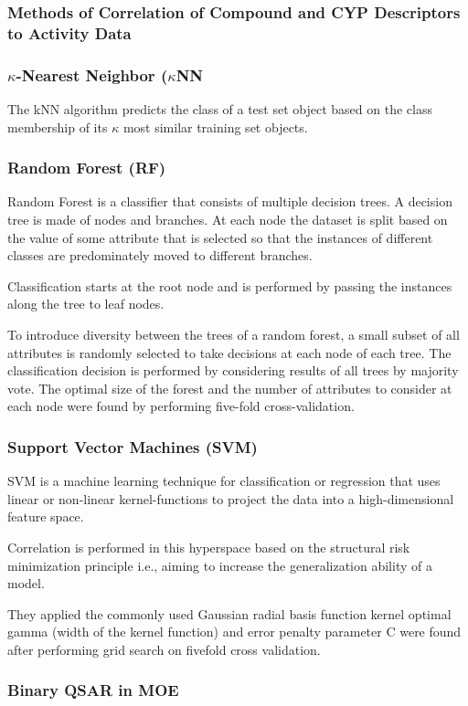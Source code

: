 \subsubsection{Methods of Correlation of Compound and CYP Descriptors to Activity Data}

\subsubsection{$\kappa$-Nearest Neighbor ($\kappa$NN}
The kNN algorithm predicts the class of a test set object based on the class membership of its $\kappa$ most similar training set objects. \cite{Lapins2013}

\subsubsection{Random Forest (RF)}
Random Forest is a classifier that consists of multiple decision trees. A decision tree is made of nodes and branches. At each node the dataset is split based on the value of some attribute that is selected so that the instances of different classes are predominately moved to different branches. 

Classification starts at the root node and is performed by passing the instances along the tree to leaf nodes. \cite{Lapins2013}

To introduce diversity between the trees of a random forest, a small subset of all attributes is randomly selected to take decisions at each node of each tree. The classification decision is performed by considering results of all trees by majority vote. The optimal size of the forest and the number of attributes to consider at each node were found by performing five-fold cross-validation. \cite{Lapins2013}

\subsubsection{Support Vector Machines (SVM)}
SVM is a machine learning technique for classification or regression that uses linear or non-linear kernel-functions to project the data into a high-dimensional feature space. \cite{Lapins2013}

Correlation is performed in this hyperspace based on the structural risk minimization principle i.e., aiming to increase the generalization ability of a model. \cite{Lapins2013}

They applied the commonly used Gaussian radial basis function kernel optimal gamma (width of the kernel function) and error penalty parameter C were found after performing grid search on five­fold cross validation. \cite{Lapins2013}

\subsubsection{Binary QSAR in MOE}


